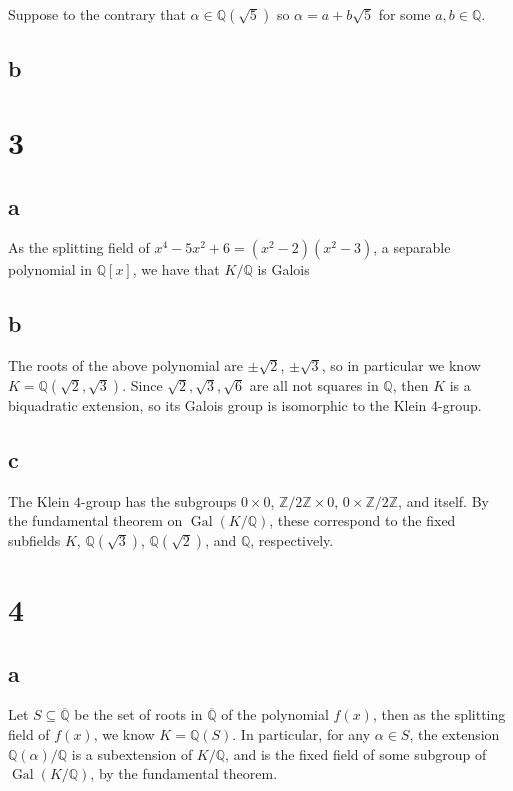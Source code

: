 \documentclass[12pt]{article}
\newcommand{\Z}{\mathbb{Z}}
\newcommand{\Q}{\mathbb{Q}}
\newcommand{\<}{\langle}
\renewcommand{\>}{\rangle}
\newcommand{\clo}{\overline}
\DeclareMathOperator{\Gal}{Gal}
\begin{document}
Suppose to the contrary that $\alpha \in \Q(\sqrt{5})$ so $\alpha = a + b\sqrt{5}$ for some $a, b \in \Q$.

\subsection*{b}




\newpage
\section*{3}

\subsection*{a}

As the splitting field of $x^4 - 5x^2 + 6 = (x^2 - 2)(x^2 - 3)$, a separable polynomial in $\Q[x]$, we have that $K/\Q$ is Galois

\subsection*{b}

The roots of the above polynomial are $\pm\sqrt{2}$, $\pm\sqrt{3}$, so in particular we know $K = \Q(\sqrt{2}, \sqrt{3})$. Since $\sqrt{2}, \sqrt{3}, \sqrt{6}$ are all not squares in $\Q$, then $K$ is a biquadratic extension, so its Galois group is isomorphic to the Klein $4$-group.

\subsection*{c}

The Klein $4$-group has the subgroups $0 \times 0$, $\Z/2\Z \times 0$, $0 \times \Z/2\Z$, and itself. By the fundamental theorem on $\Gal(K/\Q)$, these correspond to the fixed subfields $K$, $\Q(\sqrt{3})$, $\Q(\sqrt{2})$, and $\Q$, respectively.



\newpage
\section*{4}

\subsection*{a}

Let $S \subseteq \clo{\Q}$ be the set of roots in $\clo{\Q}$ of the polynomial $f(x)$, then as the splitting field of $f(x)$, we know $K = \Q(S)$. In particular, for any $\alpha \in S$, the extension $\Q(\alpha)/\Q$ is a subextension of $K/\Q$, and is the fixed field of some subgroup of $\Gal(K/\Q)$, by the fundamental theorem.
\end{document}
